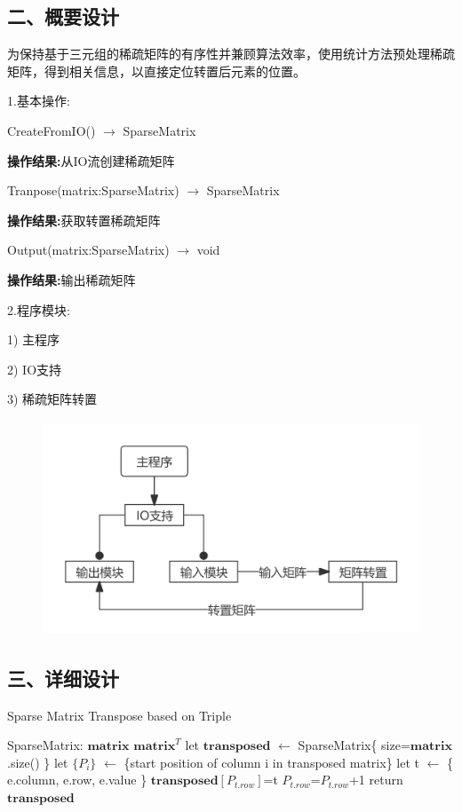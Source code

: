 \documentclass[UTF8, a4paper]{ctexart}
\begin{document}
\subsection*{二、概要设计}
为保持基于三元组的稀疏矩阵的有序性并兼顾算法效率，使用统计方法预处理稀疏矩阵，得到相关信息，以直接定位转置后元素的位置。 \par
1.\;基本操作: \par
	CreateFromIO() $\rightarrow$ SparseMatrix \par
	\qquad\textbf{操作结果:}\;从IO流创建稀疏矩阵 \par
	Tranpose(matrix:SparseMatrix) $\rightarrow$ SparseMatrix \par
	\qquad\textbf{操作结果:}\;获取转置稀疏矩阵 \par
	Output(matrix:SparseMatrix) $\rightarrow$ void \par
	\qquad\textbf{操作结果:}\;输出稀疏矩阵 \par
2.\;程序模块: \par
1) 主程序 \par
2) IO支持 \par
3) 稀疏矩阵转置 \par
\begin{figure}[H]
	\begin{minipage}[t]{\linewidth}
		\centering
		\includegraphics[width=125mm,height=64mm]{./assets/DS03-1}
	\end{minipage}
\end{figure}

\subsection*{三、详细设计}
\begin{algorithm}
\begin{algorithmic}[1]
\caption{Sparse Matrix Transpose based on Triple}
\Require SparseMatrix: $\mathbf{matrix}$
\Ensure $\mathbf{matrix}^T$
\State let $\mathbf{transposed}$ $\leftarrow$ SparseMatrix\{ size=$\mathbf{matrix}$.size() \}
\State let $\{P_i\}$ $\leftarrow$ \{start position of column i in transposed matrix\}
	\State let t $\leftarrow$ \{ e.column, e.row, e.value \}
	\State $\mathbf{transposed}[P_{t.row}]$=t
	\State $P_{t.row}$=$P_{t.row}$+1
\EndFor
\State return $\mathbf{transposed}$
\end{algorithmic}
\end{algorithm}
\end{document}
